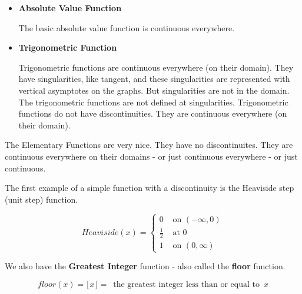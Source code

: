 \documentclass{ximera}
\begin{document}
\begin{itemize}
\item \textbf{\textcolor{blue!55!black}{Absolute Value Function}} 

The basic absolute value function is continuous everywhere.







\item \textbf{\textcolor{blue!55!black}{Trigonometric Function}} 

Trigonometric functions are continuous everywhere (on their domain).  They have singularities, like tangent, and these singularities are represented with vertical asymptotes on the graphs.  But singularities are not in the domain.  The trigonometric functions are not defined at singularities. Trigonometric functions do not have discontinuities.  They are continuous everywhere (on their domain). 








\end{itemize}




The Elementary Functions are very nice.  They have no discontinuites.  They are continuous everywhere on their domains - or just continuous everywhere - or just continuous.





The first example of a simple function with a discontinuity is the Heaviside step (unit step) function.






\[
Heaviside(x) = 
\begin{cases}
  0 & \text{ on } (-\infty, 0) \\
  \tfrac{1}{2} & \text{ at } 0 \\
  1 & \text{ on } (0, \infty) 
\end{cases}
\]






We also have the \textbf{Greatest Integer} function - also called the \textbf{floor} function.


\[
floor(x) = \lfloor x \rfloor = \, \text{ the greatest integer less than or equal to } \, x
\]
\end{document}
